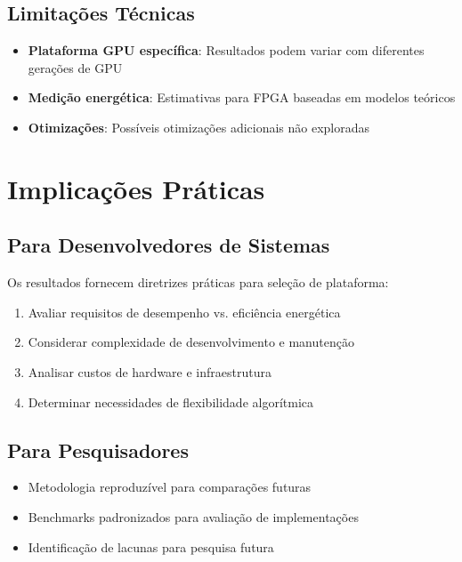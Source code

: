 \subsection{Limitações Técnicas}
\begin{itemize}
    \item \textbf{Plataforma GPU específica}: Resultados podem variar com diferentes gerações de GPU
    \item \textbf{Medição energética}: Estimativas para FPGA baseadas em modelos teóricos
    \item \textbf{Otimizações}: Possíveis otimizações adicionais não exploradas
\end{itemize}

\section{Implicações Práticas}\label{sec:implicacoes_praticas}

\subsection{Para Desenvolvedores de Sistemas}
Os resultados fornecem diretrizes práticas para seleção de plataforma:

\begin{enumerate}
    \item Avaliar requisitos de desempenho vs. eficiência energética
    \item Considerar complexidade de desenvolvimento e manutenção
    \item Analisar custos de hardware e infraestrutura
    \item Determinar necessidades de flexibilidade algorítmica
\end{enumerate}

\subsection{Para Pesquisadores}
\begin{itemize}
    \item Metodologia reproduzível para comparações futuras
    \item Benchmarks padronizados para avaliação de implementações
    \item Identificação de lacunas para pesquisa futura
\end{itemize}

